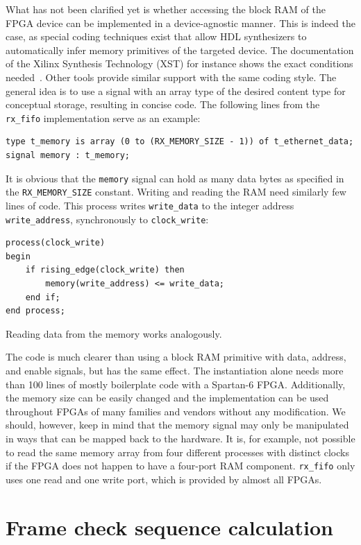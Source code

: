 \documentclass[a4paper, 11pt, oneside]{Thesis}  %
\begin{document}
What has not been clarified yet is whether accessing the block RAM of the FPGA device can be implemented in a device-agnostic manner. This is indeed the case, as special coding techniques exist that allow HDL synthesizers to automatically infer memory primitives of the targeted device. The documentation of the Xilinx Synthesis Technology (XST) for instance shows the exact conditions needed~\cite{XST}. Other tools provide similar support with the same coding style. The general idea is to use a signal with an array type of the desired content type for conceptual storage, resulting in concise code. The following lines from the \texttt{rx\_fifo} implementation serve as an example:
\begin{lstlisting}
type t_memory is array (0 to (RX_MEMORY_SIZE - 1)) of t_ethernet_data;
signal memory : t_memory;
\end{lstlisting}
It is obvious that the \texttt{memory} signal can hold as many data bytes as specified in the \texttt{RX\_MEMORY\_SIZE} constant. Writing and reading the RAM need similarly few lines of code. This process writes \texttt{write\_data} to the integer address \texttt{write\_address}, synchronously to \texttt{clock\_write}:
\begin{lstlisting}
process(clock_write)
begin
	if rising_edge(clock_write) then
		memory(write_address) <= write_data;
	end if;
end process;
\end{lstlisting}
Reading data from the memory works analogously.

The code is much clearer than using a block RAM primitive with data, address, and enable signals, but has the same effect. The instantiation alone needs more than 100 lines of mostly boilerplate code with a Spartan-6 FPGA. Additionally, the memory size can be easily changed and the implementation can be used throughout FPGAs of many families and vendors without any modification. We should, however, keep in mind that the memory signal may only be manipulated in ways that can be mapped back to the hardware. It is, for example, not possible to read the same memory array from four different processes with distinct clocks if the FPGA does not happen to have a four-port RAM component. \texttt{rx\_fifo} only uses one read and one write port, which is provided by almost all FPGAs.

\section{Frame check sequence calculation}
\end{document}

